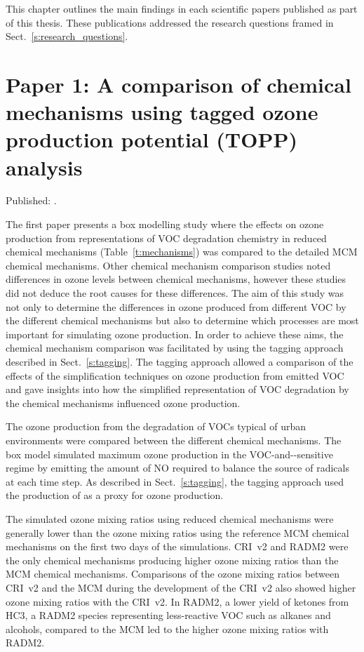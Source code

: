 This chapter outlines the main findings in each scientific papers published as part of this thesis.
These publications addressed the research questions framed in Sect.~\ref{s:research_questions}.

\singlespacing
\section[Paper 1]{Paper 1: A comparison of chemical mechanisms using tagged ozone production potential (TOPP) analysis} \label{s:chemical_mechanism_results}
\onehalfspacing

Published: .
\vspace{5mm}

The first paper presents a box modelling study where the effects on ozone production from representations of VOC degradation chemistry in reduced chemical mechanisms (Table~\ref{t:mechanisms}) was compared to the detailed MCM chemical mechanisms.
Other chemical mechanism comparison studies noted differences in ozone levels between chemical mechanisms, however these studies did not deduce the root causes for these differences.
The aim of this study was not only to determine the differences in ozone produced from different VOC by the different chemical mechanisms but also to determine which processes are most important for simulating ozone production.
In order to achieve these aims, the chemical mechanism comparison was facilitated by using the tagging approach described in Sect.~\ref{s:tagging}.
The tagging approach allowed a comparison of the effects of the simplification techniques on ozone production from emitted VOC and gave insights into how the simplified representation of VOC degradation by the chemical mechanisms influenced ozone production.

The ozone production from the degradation of VOCs typical of urban environments were compared between the different chemical mechanisms.
The box model simulated maximum ozone production in the VOC-and--sensitive regime by emitting the amount of NO required to balance the source of radicals at each time step.
As described in Sect.~\ref{s:tagging}, the tagging approach used the production of  as a proxy for ozone production.

The simulated ozone mixing ratios using reduced chemical mechanisms were generally lower than the ozone mixing ratios using the reference MCM chemical mechanisms on the first two days of the simulations.
CRI~v2 and RADM2 were the only chemical mechanisms producing higher ozone mixing ratios than the MCM chemical mechanisms.
Comparisons of the ozone mixing ratios between CRI~v2 and the MCM during the development of the CRI~v2 also showed higher ozone mixing ratios with the CRI~v2.
In RADM2, a lower yield of ketones from HC3, a RADM2 species representing less-reactive VOC such as alkanes and alcohols, compared to the MCM led to the higher ozone mixing ratios with RADM2.

